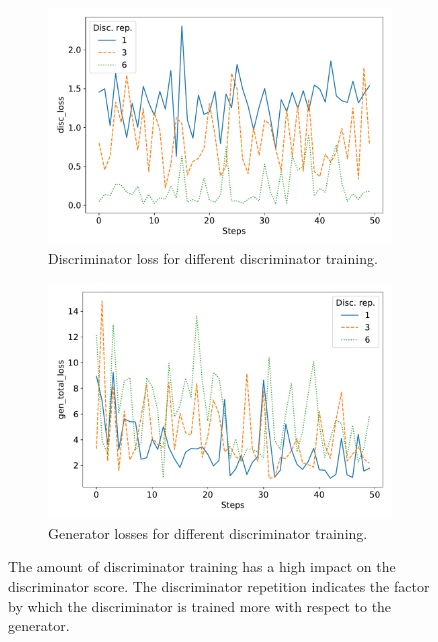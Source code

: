 \begin{figure}
	\centering
	\begin{subfigure}{0.5\linewidth}
		\centering
		\includegraphics[width=\textwidth]{fig/analysis/Plot_Disc_rep_disc_loss.pdf}
		\caption{Discriminator loss for different discriminator training.}
		\label{fig:Plot_discrep_discloss}
	\end{subfigure}\hfill
	\begin{subfigure}{0.5\linewidth}
		\centering
		\includegraphics[width=\textwidth]{fig/analysis/Plot_Disc_rep_gen_total_loss.pdf}
		\caption{Generator losses for different discriminator training.}
		\label{fig:Plot_discrep_genloss}
	\end{subfigure}\hfill
	\caption{The amount of discriminator training has a high impact on the discriminator score. The discriminator repetition indicates the factor by which the discriminator is trained more with respect to the generator.}
	\label{fig:Plot_discrep_loss}
\end{figure}
